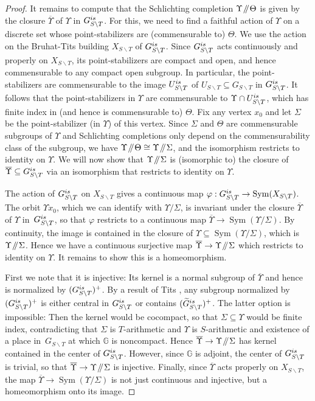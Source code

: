 \documentclass[11pt]{article}
\numberwithin{equation}{section}\providecommand{\llangle}{\langle\!\langle}\providecommand{\rrangle}{\rangle\!\rangle}\providecommand{\Asterisk}{\ast}
\newcommand{\Y}{\ensuremath{\Upsilon}}
\let\bs\backslash
\newcommand{\sslash}{\mathbin{\mkern-3mu /\mkern-5mu/ \mkern-3mu}}
\newcommand{\bbG}{\ensuremath{\mathbb{G}}}
\DeclareMathOperator{\Sym}{Sym}
\theoremstyle{definition}
\begin{document}
\begin{proof}
It remains to compute that the Schlichting completion $\Y\sslash\Theta$ is given by the closure $\overline{\Y}$ of $\Y$ in $G_{S\bs T}^{\textup{is}}$. For this, we need to find a faithful action of $\Y$ on a discrete set whose point-stabilizers are (commensurable to) $\Theta$. We use the action on the Bruhat-Tits building $X_{S\bs T}$ of $G_{S\bs T}^{\textup{is}}$. Since $G_{S\bs T}^{\textup{is}}$ acts continuously and properly on $X_{S\bs T}$, its point-stabilizers are compact and open, and hence commensurable to any compact open subgroup. In particular, the point-stabilizers are commensurable to the image $U_{S\bs T}^{\textup{is}}$ of $U_{S\bs T}\subseteq G_{S\bs T}$ in $G_{S\bs T}^{\textup{is}}$. It follows that the point-stabilizers in $\Y$ are commensurable to $\Y\cap U_{S\bs T}^{\textup{is}}$, which has finite index in (and hence is commensurable to) $\Theta$. Fix any vertex $x_0$ and let $\Sigma$ be the point-stabilizer (in $\Y$) of this vertex. Since $\Sigma$ and $\Theta$ are commensurable subgroups of $\Y$ and Schlichting completions only depend on the commensurability class of the subgroup, we have $\Y\sslash\Theta\cong \Y\sslash\Sigma$, and the isomorphism restricts to identity on $\Y$. We will now show that $\Y\sslash\Sigma$ is (isomorphic to) the closure of $\overline{\Y}\subseteq G_{S\bs T}^{\textup{is}}$ via an isomorphism that restricts to identity on $\Y$.

The action of $G_{S\bs T}^{\textup{is}}$ on $X_{S\bs T}$ gives a continuous map $\varphi:G_{S\bs T}^{\textup{is}}\to \Sym(X_{S\bs T})$. The orbit $\Y x_0$, which we can identify with $\Y/\Sigma$, is invariant under the closure $\overline{\Y}$ of $\Y$ in~$G_{S\bs T}^{\textup{is}}$, so that $\varphi$ restricts to a continuous map $\overline{\Y}\to \Sym(\Y/\Sigma)$. By continuity, the image is contained in the closure of $\Y\subseteq\Sym(\Y/\Sigma)$, which is $\Y\sslash\Sigma$. Hence we have a continuous surjective map $\overline{\Y}\to\Y\sslash\Sigma$ which restricts to identity on $\Y$. It remains to show this is a homeomorphism.

First we note that it is injective: Its kernel is a normal subgroup of $\overline{\Y}$ and hence is normalized by $(G_{S\bs T}^{\textup{is}})^+$. By a result of Tits \cite{tits-simple}, any subgroup normalized by $(G_{S\bs T}^{\textup{is}})^+$ is either central in $G_{S\bs T}^{\textup{is}}$ or contains $(\widetilde{G}_{S\bs T}^{\textup{is}})^+$. The latter option is impossible: Then the kernel would be cocompact, so that $\Sigma\subseteq\Y$ would be finite index, contradicting that $\Sigma$ is $T$-arithmetic and $\Y$ is $S$-arithmetic and existence of a place in~$G_{S\bs T}$ at which $\bbG$ is noncompact. Hence $\overline{\Y}\to\Y\sslash\Sigma$ has kernel contained in the center of $G_{S\bs T}^{\textup{is}}$. However, since $\bbG$ is adjoint, the center of $G_{S\bs T}^{\textup{is}}$ is trivial, so that $\overline{\Y}\to\Y\sslash\Sigma$ is injective. Finally, since $\overline{\Y}$ acts properly on $X_{S\bs T}$, the map $\overline{\Y}\to \Sym(\Y / \Sigma)$ is not just continuous and injective, but a homeomorphism onto its image. \end{proof}
\end{document}

